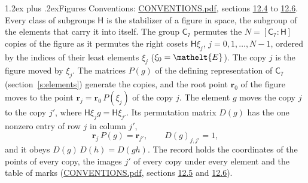 \documentclass[10pt,a4paper]{article}
\makeatletter
\renewcommand\section{\@startsection{section}{1}{\z@}{-3ex plus -1ex minus -.2ex}%
  {1.2ex plus .2ex}{\normalfont\large\sffamily\bfseries\color{parttitle}}}
\numberwithin{equation}{section}
\newcommand{\eltfont}[1]{{\let\sigma\eltsigma\mathelt{#1}}}
\newcommand{\grp}[1]{\mathsf{#1}}
\newcommand{\cls}[1]{\eltfont{#1}}
\newcommand{\pointr}{\mathbf{r}}
\makeatother
\begin{document}
\section{Figures}\label{s:permutation}
Conventions: \href{../../CONVENTIONS.pdf}{CONVENTIONS.pdf}, sections \href{../../CONVENTIONS.pdf\#conv.12.4}{12.4} to \href{../../CONVENTIONS.pdf\#conv.12.6}{12.6}.
Every class of subgroups $\grp{H}$ is the stabilizer of a figure in space, the subgroup of the elements that carry it into itself. \label{n:local.orbit.size}\label{n:element.coset.least}\label{n:index.coset}The group $\grp{C_{7}}$ permutes the $N = [\grp{C_{7}} : \grp{H}]$ copies of the figure as it permutes the right cosets $\grp{H}\xi_j$, $j = 0, 1, \dots, N - 1$, ordered by the indices of their least elements $\xi_j$ ($\xi_0 = \cls{E}$). The copy $j$ is the figure moved by $\xi_j$. The matrices $P(g)$ of the defining representation of $\grp{C_{7}}$ (section~\ref{s:elements}) generate the copies, and the root point $\pointr_0$ of the figure moves to the point $\pointr_j = \pointr_0\, P(\xi_j)$ of the copy $j$. \label{n:local.coset.image}The element $g$ moves the copy $j$ to the copy $j'$, where $\grp{H}\xi_j g = \grp{H}\xi_{j'}$. \label{n:local.matrix.permutation}Its permutation matrix $D(g)$ has the one nonzero entry of row $j$ in column $j'$,
\begin{equation}\label{e:perm.matrix}\pointr_j\, P(g) = \pointr_{j'}, \qquad D(g)_{j,j'} = 1,\end{equation}
and it obeys $D(g)\, D(h) = D(gh)$. The record holds the coordinates of the points of every copy, the images $j'$ of every copy under every element and the table of marks (\href{../../CONVENTIONS.pdf}{CONVENTIONS.pdf}, sections \href{../../CONVENTIONS.pdf\#conv.12.5}{12.5} and \href{../../CONVENTIONS.pdf\#conv.12.6}{12.6}).
\end{document}
